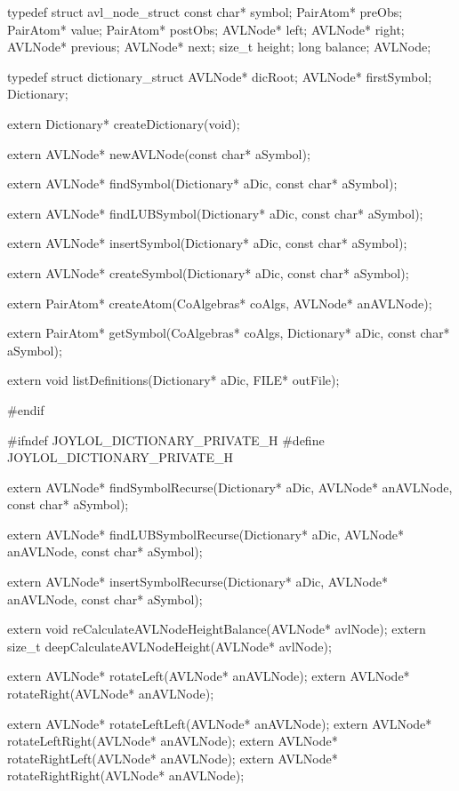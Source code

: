 typedef struct avl_node_struct {
  const char* symbol;
  PairAtom*   preObs;
  PairAtom*   value;
  PairAtom*   postObs;
  AVLNode*    left;
  AVLNode*    right;
  AVLNode*    previous;
  AVLNode*    next;
  size_t      height;
  long        balance;
} AVLNode;

typedef struct dictionary_struct {
  AVLNode*    dicRoot;
  AVLNode*    firstSymbol;
} Dictionary;

extern Dictionary* createDictionary(void);

extern AVLNode* newAVLNode(const char* aSymbol);

extern AVLNode* findSymbol(Dictionary* aDic, const char* aSymbol);

extern AVLNode* findLUBSymbol(Dictionary* aDic, const char* aSymbol);

extern AVLNode* insertSymbol(Dictionary* aDic, const char* aSymbol);

extern AVLNode* createSymbol(Dictionary* aDic, const char* aSymbol);

extern PairAtom* createAtom(CoAlgebras* coAlgs, AVLNode* anAVLNode);

extern PairAtom* getSymbol(CoAlgebras* coAlgs,
                           Dictionary* aDic,
                           const char* aSymbol);

extern void listDefinitions(Dictionary* aDic, FILE* outFile);

#endif
\stoptyping

\starttyping
#ifndef JOYLOL_DICTIONARY_PRIVATE_H
#define JOYLOL_DICTIONARY_PRIVATE_H

extern AVLNode* findSymbolRecurse(Dictionary* aDic,
                                  AVLNode* anAVLNode,
                                  const char* aSymbol);

extern AVLNode* findLUBSymbolRecurse(Dictionary* aDic,
                                     AVLNode* anAVLNode,
                                     const char* aSymbol);

extern AVLNode* insertSymbolRecurse(Dictionary* aDic,
                                    AVLNode* anAVLNode,
                                    const char* aSymbol);


extern void reCalculateAVLNodeHeightBalance(AVLNode* avlNode);
extern size_t deepCalculateAVLNodeHeight(AVLNode* avlNode);

extern AVLNode* rotateLeft(AVLNode* anAVLNode);
extern AVLNode* rotateRight(AVLNode* anAVLNode);

extern AVLNode* rotateLeftLeft(AVLNode* anAVLNode);
extern AVLNode* rotateLeftRight(AVLNode* anAVLNode);
extern AVLNode* rotateRightLeft(AVLNode* anAVLNode);
extern AVLNode* rotateRightRight(AVLNode* anAVLNode);


